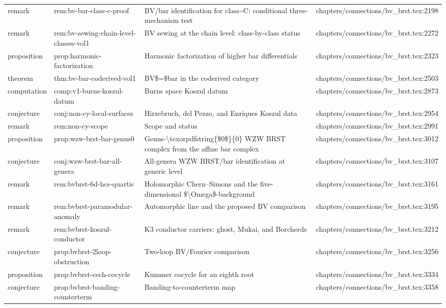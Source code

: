\documentclass[11pt]{article}
\begin{document}
\begin{longtable}{L{0.10\textwidth}L{0.26\textwidth}L{0.42\textwidth}L{0.22\textwidth}}
remark & rem:bv-bar-class-c-proof & BV/bar identification for class\textasciitilde{}C: cond{}itional three-mechanism test & chapters/connections/bv\_brst.tex:2198\\
remark & rem:bv-sewing-chain-level-classes-vol1 & BV sewing at the chain level: class-by-class stat{}us & chapters/connections/bv\_brst.tex:2272\\
proposition & prop:harmonic-factorization & Harmonic factorization of higher bar differentials & chapters/connections/bv\_brst.tex:2323\\
theorem & thm:bv-bar-coderived-vol1 & BV\$=\$bar in the coderived category & chapters/connections/bv\_brst.tex:2503\\
computation & comp:v1-burns-koszul-datum & Burns space Koszul datum & chapters/connections/bv\_brst.tex:2873\\
conjecture & conj:non-cy-local-surfaces & Hirzebruch, del Pezzo, and Enriques Koszul data & chapters/connections/bv\_brst.tex:2954\\
remark & rem:non-cy-scope & Scope and stat{}us & chapters/connections/bv\_brst.tex:2991\\
proposition & prop:wzw-brst-bar-genus0 & Genus-\textbackslash{}texorpdfstring\{\$0\$\}\{0\} WZW BRST complex from the affine bar complex & chapters/connections/bv\_brst.tex:3012\\
conjecture & conj:wzw-brst-bar-all-genera & All-genera WZW BRST/bar identification at generic level & chapters/connections/bv\_brst.tex:3107\\
remark & rem:bvbrst-6d-hcs-quartic & Holomorphic Chern--Simons and the five-dimensional \$\textbackslash{}Omega\$-background & chapters/connections/bv\_brst.tex:3161\\
remark & rem:bvbrst-paramodular-anomaly & Automorphic line and the proposed BV comparison & chapters/connections/bv\_brst.tex:3195\\
remark & rem:bvbrst-koszul-conductor & K3 conductor carriers: ghost, Mukai, and Borcherds & chapters/connections/bv\_brst.tex:3212\\
conjecture & prop:bvbrst-2loop-obstruction & Two-loop BV/Fourier comparison & chapters/connections/bv\_brst.tex:3256\\
proposition & prop:bvbrst-cech-cocycle & Kummer cocycle for an eighth root & chapters/connections/bv\_brst.tex:3334\\
conjecture & prop:bvbrst-banding-counterterm & Banding-to-counterterm map & chapters/connections/bv\_brst.tex:3358\\

\end{longtable}
\end{document}
